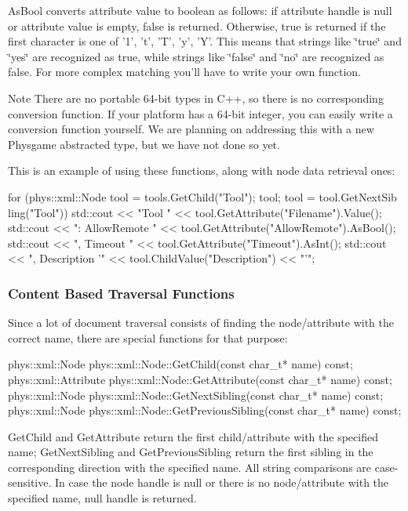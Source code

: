 AsBool converts attribute value to boolean as follows: if attribute handle is null or attribute value is empty, false is returned. Otherwise, true is returned if the first character is one of '1', 't', 'T', 'y', 'Y'. This means that strings like \char`\"{}true\char`\"{} and \char`\"{}yes\char`\"{} are recognized as true, while strings like \char`\"{}false\char`\"{} and \char`\"{}no\char`\"{} are recognized as false. For more complex matching you'll have to write your own function. \begin{DoxyNote}{Note}
There are no portable 64-\/bit types in C++, so there is no corresponding conversion function. If your platform has a 64-\/bit integer, you can easily write a conversion function yourself. We are planning on addressing this with a new Physgame abstracted type, but we have not done so yet.
\end{DoxyNote}
This is an example of using these functions, along with node data retrieval ones: 
\begin{DoxyCode}
 for (phys::xml::Node tool = tools.GetChild("Tool"); tool; tool = tool.GetNextSib
      ling("Tool"))
 {
     std::cout << "Tool " << tool.GetAttribute("Filename").Value();
     std::cout << ": AllowRemote " << tool.GetAttribute("AllowRemote").AsBool();
     std::cout << ", Timeout " << tool.GetAttribute("Timeout").AsInt();
     std::cout << ", Description '" << tool.ChildValue("Description") << "'\n";
 }
\end{DoxyCode}
 \hypertarget{XMLManual_XMLAccessingContentBased}{}\subsubsection{Content Based Traversal Functions}\label{XMLManual_XMLAccessingContentBased}
Since a lot of document traversal consists of finding the node/attribute with the correct name, there are special functions for that purpose: 
\begin{DoxyCode}
 phys::xml::Node phys::xml::Node::GetChild(const char_t* name) const;
 phys::xml::Attribute phys::xml::Node::GetAttribute(const char_t* name) const;
 phys::xml::Node phys::xml::Node::GetNextSibling(const char_t* name) const;
 phys::xml::Node phys::xml::Node::GetPreviousSibling(const char_t* name) const;
\end{DoxyCode}
 GetChild and GetAttribute return the first child/attribute with the specified name; GetNextSibling and GetPreviousSibling return the first sibling in the corresponding direction with the specified name. All string comparisons are case-\/sensitive. In case the node handle is null or there is no node/attribute with the specified name, null handle is returned. \par
